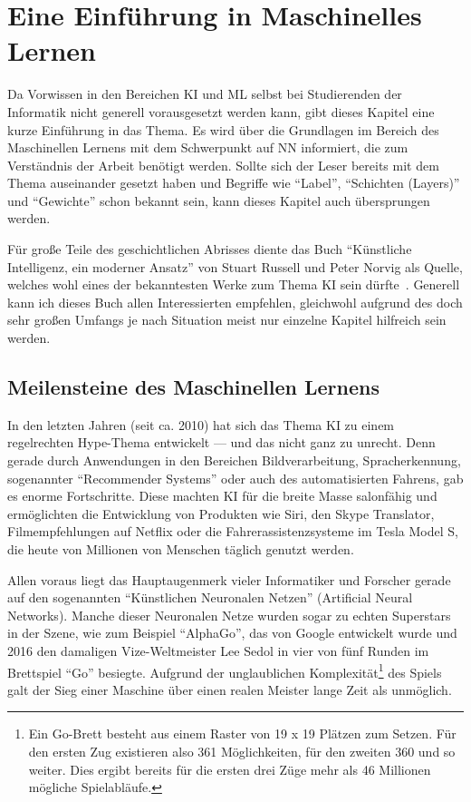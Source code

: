 \chapter{Eine Einführung in Maschinelles Lernen}
Da Vorwissen in den Bereichen \gls{KI} und \gls{ML} selbst bei Studierenden der Informatik nicht generell vorausgesetzt werden kann, gibt dieses Kapitel eine kurze Einführung in das Thema. Es wird über die Grundlagen im Bereich des Maschinellen Lernens mit dem Schwerpunkt auf \gls{NN} informiert, die zum Verständnis der Arbeit benötigt werden. Sollte sich der Leser bereits mit dem Thema auseinander gesetzt haben und Begriffe wie "`\gls{Label}"', "`Schichten (Layers)"' und "`Gewichte"' schon bekannt sein, kann dieses Kapitel auch übersprungen werden.

Für große Teile des geschichtlichen Abrisses diente das Buch "`Künstliche Intelligenz, ein moderner Ansatz"' von Stuart Russell und Peter Norvig als Quelle, welches wohl eines der bekanntesten Werke zum Thema \gls{KI} sein dürfte~\cite{Russell.2012}. Generell kann ich dieses Buch allen Interessierten empfehlen, gleichwohl aufgrund des doch sehr großen Umfangs je nach Situation meist nur einzelne Kapitel hilfreich sein werden.

\section{Meilensteine des Maschinellen Lernens} \label{sec:milestones}
In den letzten Jahren (seit ca. 2010) hat sich das Thema \gls{KI} zu einem regelrechten Hype-Thema entwickelt --- und das nicht ganz zu unrecht. Denn gerade durch Anwendungen in den Bereichen Bildverarbeitung, Spracherkennung, sogenannter "`Recommender Systems"' oder auch des automatisierten Fahrens, gab es enorme Fortschritte. Diese machten \gls{KI} für die breite Masse salonfähig und ermöglichten die Entwicklung von Produkten wie Siri, den Skype Translator, Filmempfehlungen auf Netflix oder die Fahrerassistenzsysteme im Tesla Model S, die heute von Millionen von Menschen täglich genutzt werden.

Allen voraus liegt das Hauptaugenmerk vieler Informatiker und Forscher gerade auf den sogenannten "`Künstlichen Neuronalen Netzen"' (Artificial Neural Networks). Manche dieser Neuronalen Netze wurden sogar zu echten Superstars in der Szene, wie zum Beispiel "`AlphaGo"', das von Google entwickelt wurde und 2016 den damaligen Vize-Weltmeister Lee Sedol in vier von fünf Runden im Brettspiel "`Go"' besiegte. Aufgrund der unglaublichen Komplexität\footnote{Ein Go-Brett besteht aus einem Raster von 19 x 19 Plätzen zum Setzen. Für den ersten Zug existieren also 361 Möglichkeiten, für den zweiten 360 und so weiter. Dies ergibt bereits für die ersten drei Züge mehr als 46 Millionen mögliche Spielabläufe.} des Spiels galt der Sieg einer Maschine über einen realen Meister lange Zeit als unmöglich.

